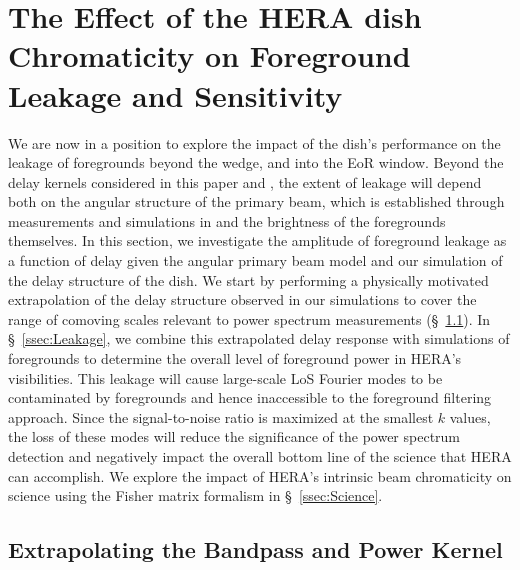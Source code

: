 \documentclass[twocolumn]{emulateapj}
\begin{document}
\section{The Effect of the HERA dish Chromaticity on Foreground Leakage and Sensitivity}\label{sec:Sensitivity}
We are now in a position to explore the impact of the dish's performance on the leakage of foregrounds beyond the wedge, and into the EoR window. Beyond the delay kernels considered in this paper and \citet{Patra:2016}, the extent of leakage will depend both on the angular structure of the primary beam, which is established through measurements and simulations in \citet{Neben:2016} and the brightness of the foregrounds themselves. In this section, we investigate the amplitude of foreground leakage as a function of delay given the angular primary beam model and our simulation of the delay structure of the dish. We start by performing a physically motivated extrapolation of the delay structure observed in our simulations to cover the range of comoving scales relevant to power spectrum measurements (\S~\ref{ssec:Extrapolation}). In \S~\ref{ssec:Leakage}, we combine this extrapolated delay response with simulations of foregrounds to determine the overall level of foreground power in HERA's visibilities. This leakage will cause large-scale LoS Fourier modes to be contaminated by foregrounds and hence inaccessible to the foreground filtering approach. Since the signal-to-noise ratio is maximized at the smallest $k$ values, the loss of these modes will reduce the significance of the power spectrum detection and negatively impact the overall bottom line of the science that HERA can accomplish. We explore the impact of HERA's intrinsic beam chromaticity on science using the Fisher matrix formalism in \S~\ref{ssec:Science}. 


\subsection{Extrapolating the Bandpass and Power Kernel}\label{ssec:Extrapolation}
\end{document}
